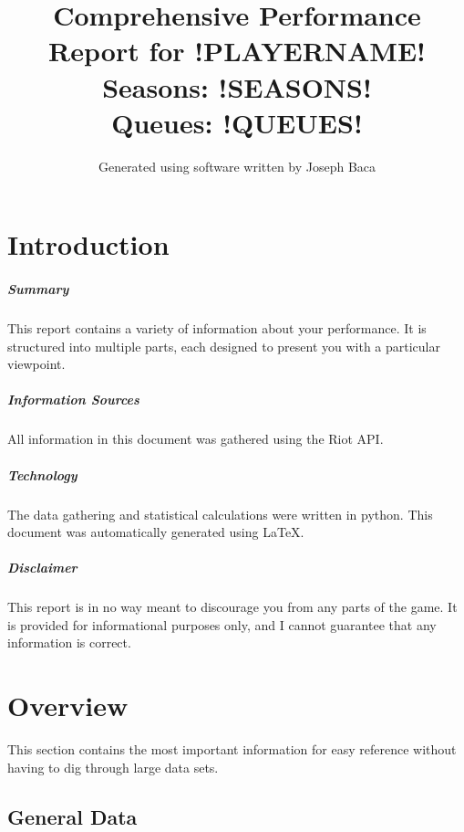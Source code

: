 \documentclass[paper=letter, landscape, oneside]{report}
\title{Comprehensive Performance Report for !PLAYERNAME!\\
Seasons: !SEASONS!\\
Queues: !QUEUES!
}
\author{Generated using software written by Joseph Baca}
\begin{document}
\maketitle
\tableofcontents

\chapter*{Introduction}

\paragraph{Summary}
This report contains a variety of information about your performance.  It is structured into multiple parts, each designed to present you with a particular viewpoint. 

\paragraph{Information Sources}
All information in this document was gathered using the Riot API.

\paragraph{Technology}
The data gathering and statistical calculations were written in python. This document was automatically generated using \LaTeX.

\paragraph{Disclaimer}
This report is in no way meant to discourage you from any parts of the game. It is provided for informational purposes only, and I cannot guarantee that any information is correct.

\chapter{Overview}

This section contains the most important information for easy reference without having to dig through large data sets.

\section{General Data}

\end{document}

